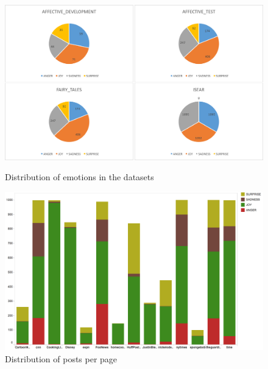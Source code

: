 \documentclass[11pt]{article}
\begin{document}
\begin{figure}[hbt]
\begin{minipage}{.48\textwidth}
  \includegraphics[scale=.3]{distribution_data.png}
  \caption{Distribution of emotions in the datasets  \label{fig:distribution_data-sets}}
\end{minipage}
\begin{minipage}{.48\textwidth}
    \includegraphics[scale=.15,keepaspectratio]{distribution_facebook.png}  
\caption{Distribution of posts per page\label{fig:distribution_facebook}}
\end{minipage}
\end{figure}


\end{document}
